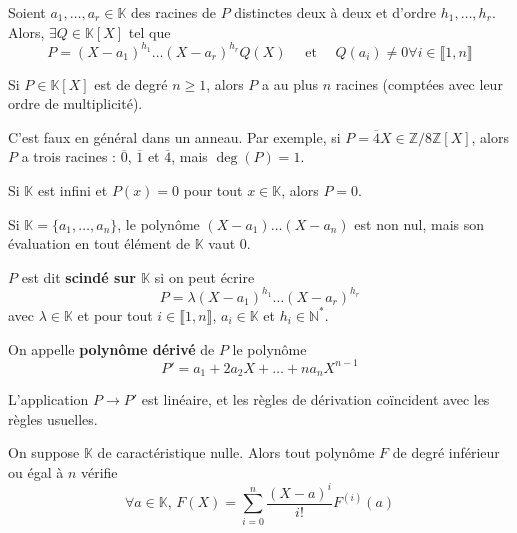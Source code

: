 	\begin{proposition}
		Soient $a_1, \dots, a_r \in \mathbb{K}$ des racines de $P$ distinctes deux à deux et d'ordre $h_1, \dots, h_r$. Alors, $\exists Q \in \mathbb{K}[X]$ tel que
		\[ P = (X-a_1)^{h_1} \dots (X-a_r)^{h_r} Q(X) \quad \text{ et } \quad Q(a_i) \neq 0 \forall i \in \llbracket 1, n \rrbracket \]
	\end{proposition}

	\begin{corollary}
		Si $P \in \mathbb{K}[X]$ est de degré $n \geq 1$, alors $P$ a au plus $n$ racines (comptées avec leur ordre de multiplicité).
	\end{corollary}

	\begin{cexample}
		C'est faux en général dans un anneau. Par exemple, si $P = \overline{4}X \in \mathbb{Z}/8\mathbb{Z}[X]$, alors $P$ a trois racines : $\overline{0}$, $\overline{1}$ et $\overline{4}$, mais $\deg(P) = 1$.
	\end{cexample}

	\begin{proposition}
		Si $\mathbb{K}$ est infini et $P(x) = 0$ pour tout $x \in \mathbb{K}$, alors $P = 0$.
	\end{proposition}

	\begin{cexample}
		Si $\mathbb{K} = \{ a_1, \dots, a_n \}$, le polynôme $(X-a_1) \dots (X-a_n)$ est non nul, mais son évaluation en tout élément de $\mathbb{K}$ vaut $0$.
	\end{cexample}

	\begin{definition}
		$P$ est dit \textbf{scindé sur $\mathbb{K}$} si on peut écrire
		\[ P = \lambda (X-a_1)^{h_1} \dots (X-a_r)^{h_r} \]
		avec $\lambda \in \mathbb{K}$ et pour tout $i \in \llbracket 1, n \rrbracket$, $a_i \in \mathbb{K}$ et $h_i \in \mathbb{N}^*$.
	\end{definition}

	\begin{definition}
		On appelle \textbf{polynôme dérivé} de $P$ le polynôme
		\[ P' = a_1 + 2a_2 X + \dots + na_n X^{n-1} \]
	\end{definition}

	\begin{remark}
		L'application $P \rightarrow P'$ est linéaire, et les règles de dérivation coïncident avec les règles usuelles.
	\end{remark}

	\begin{theorem}
		On suppose $\mathbb{K}$ de caractéristique nulle. Alors tout polynôme $F$ de degré inférieur ou égal à $n$ vérifie
		\[ \forall a \in \mathbb{K}, \, F(X) = \sum_{i=0}^{n} \frac{(X-a)^i}{i!} F^{(i)}(a) \]
	\end{theorem}

